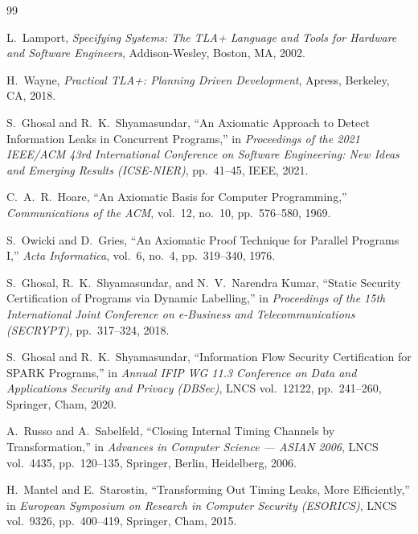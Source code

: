 \documentclass[a4paper,12pt]{report}
\begin{document}
\begin{thebibliography}{99}
\setlength{\itemsep}{0.08em}
\setlength{\parskip}{0pt}

L.~Lamport,
\newblock \emph{Specifying Systems: The TLA+ Language and Tools for Hardware and Software Engineers},
\newblock Addison-Wesley, Boston, MA, 2002.

H.~Wayne,
\newblock \emph{Practical TLA+: Planning Driven Development},
\newblock Apress, Berkeley, CA, 2018.

S.~Ghosal and R.~K.~Shyamasundar,
\newblock ``An Axiomatic Approach to Detect Information Leaks in Concurrent Programs,''
\newblock in \emph{Proceedings of the 2021 IEEE/ACM 43rd International Conference on Software Engineering: New Ideas and Emerging Results (ICSE-NIER)}, pp.~41--45, IEEE, 2021.

C.~A.~R.~Hoare,
\newblock ``An Axiomatic Basis for Computer Programming,''
\newblock \emph{Communications of the ACM}, vol.~12, no.~10, pp.~576--580, 1969.

S.~Owicki and D.~Gries,
\newblock ``An Axiomatic Proof Technique for Parallel Programs I,''
\newblock \emph{Acta Informatica}, vol.~6, no.~4, pp.~319--340, 1976.

S.~Ghosal, R.~K.~Shyamasundar, and N.~V.~Narendra Kumar,
\newblock ``Static Security Certification of Programs via Dynamic Labelling,''
\newblock in \emph{Proceedings of the 15th International Joint Conference on e-Business and Telecommunications (SECRYPT)}, pp.~317--324, 2018.

S.~Ghosal and R.~K.~Shyamasundar,
\newblock ``Information Flow Security Certification for SPARK Programs,''
\newblock in \emph{Annual IFIP WG 11.3 Conference on Data and Applications Security and Privacy (DBSec)}, LNCS vol.~12122, pp.~241--260, Springer, Cham, 2020.

A.~Russo and A.~Sabelfeld,
\newblock ``Closing Internal Timing Channels by Transformation,''
\newblock in \emph{Advances in Computer Science --- ASIAN 2006}, LNCS vol.~4435, pp.~120--135, Springer, Berlin, Heidelberg, 2006.

H.~Mantel and E.~Starostin,
\newblock ``Transforming Out Timing Leaks, More Efficiently,''
\newblock in \emph{European Symposium on Research in Computer Security (ESORICS)}, LNCS vol.~9326, pp.~400--419, Springer, Cham, 2015.


\end{thebibliography}
\end{document}
